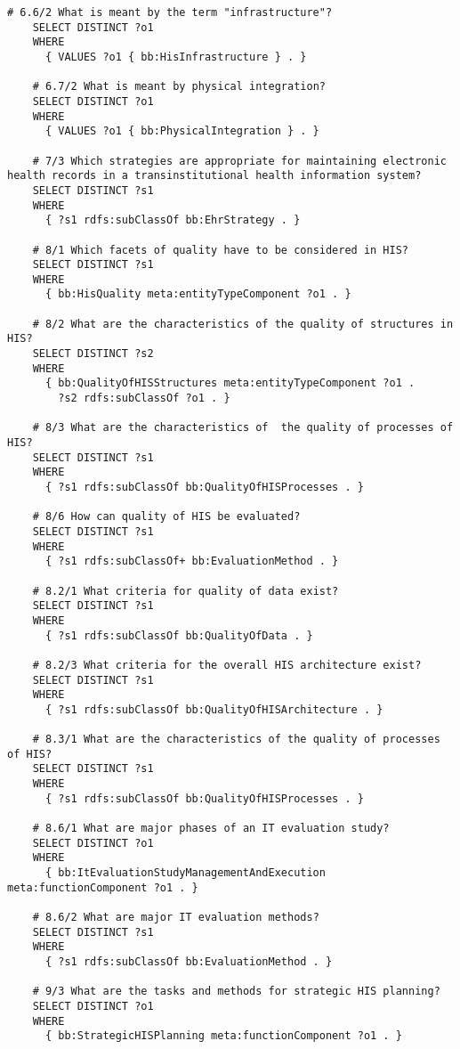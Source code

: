 \begin{lstlisting}[language=SPARQL]
    # 6.6/2 What is meant by the term "infrastructure"?
    SELECT DISTINCT ?o1
    WHERE
      { VALUES ?o1 { bb:HisInfrastructure } . }
    
    # 6.7/2 What is meant by physical integration?
    SELECT DISTINCT ?o1
    WHERE
      { VALUES ?o1 { bb:PhysicalIntegration } . }
    
    # 7/3 Which strategies are appropriate for maintaining electronic health records in a transinstitutional health information system?
    SELECT DISTINCT ?s1
    WHERE
      { ?s1 rdfs:subClassOf bb:EhrStrategy . }
    
    # 8/1 Which facets of quality have to be considered in HIS?
    SELECT DISTINCT ?s1
    WHERE
      { bb:HisQuality meta:entityTypeComponent ?o1 . }
    
    # 8/2 What are the characteristics of the quality of structures in HIS?
    SELECT DISTINCT ?s2
    WHERE
      { bb:QualityOfHISStructures meta:entityTypeComponent ?o1 .
        ?s2 rdfs:subClassOf ?o1 . }
    
    # 8/3 What are the characteristics of  the quality of processes of HIS?
    SELECT DISTINCT ?s1
    WHERE
      { ?s1 rdfs:subClassOf bb:QualityOfHISProcesses . }
    
    # 8/6 How can quality of HIS be evaluated?
    SELECT DISTINCT ?s1
    WHERE
      { ?s1 rdfs:subClassOf+ bb:EvaluationMethod . }
    
    # 8.2/1 What criteria for quality of data exist?
    SELECT DISTINCT ?s1
    WHERE
      { ?s1 rdfs:subClassOf bb:QualityOfData . }
    
    # 8.2/3 What criteria for the overall HIS architecture exist?
    SELECT DISTINCT ?s1
    WHERE
      { ?s1 rdfs:subClassOf bb:QualityOfHISArchitecture . }
    
    # 8.3/1 What are the characteristics of the quality of processes of HIS?
    SELECT DISTINCT ?s1
    WHERE
      { ?s1 rdfs:subClassOf bb:QualityOfHISProcesses . }
    
    # 8.6/1 What are major phases of an IT evaluation study?
    SELECT DISTINCT ?o1
    WHERE
      { bb:ItEvaluationStudyManagementAndExecution meta:functionComponent ?o1 . }
    
    # 8.6/2 What are major IT evaluation methods?
    SELECT DISTINCT ?s1
    WHERE
      { ?s1 rdfs:subClassOf bb:EvaluationMethod . }
    
    # 9/3 What are the tasks and methods for strategic HIS planning?
    SELECT DISTINCT ?o1
    WHERE
      { bb:StrategicHISPlanning meta:functionComponent ?o1 . }
    

\end{lstlisting}
